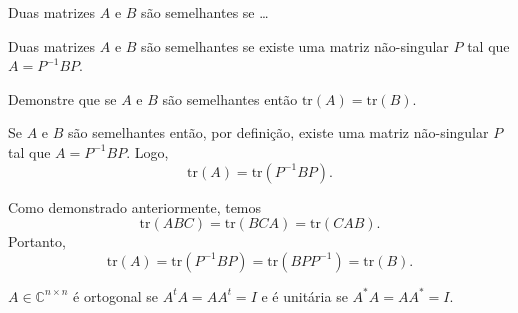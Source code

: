 \documentclass[a4paper,12pt, leqno, answers]{exam}
\begin{document}
\begin{questions}
    \question Duas matrizes $A$ e $B$ s\~{a}o semelhantes se \dots
    \begin{solution}
        Duas matrizes $A$ e $B$ s\~{a}o semelhantes se existe uma matriz n\~{a}o-singular $P$ tal que $A = P^{-1} B P$.
    \end{solution}

    Demonstre que se $A$ e $B$ s\~{a}o semelhantes ent\~{a}o $\mbox{tr}(A) = \mbox{tr}(B)$.
    \begin{solution}
        Se $A$ e $B$ s\~{a}o semelhantes ent\~{a}o, por defini\c{c}\~{a}o, existe uma matriz n\~{a}o-singular $P$ tal que $A = P^{-1} B P$. Logo,
        \[
        \mbox{tr}(A) = \mbox{tr}(P^{-1} B P).
        \]

        Como demonstrado anteriormente, temos
        \[
        \mbox{tr}(A B C) = \mbox{tr}(B C A) = \mbox{tr}(C A B).
        \]
        Portanto,
        \[
        \mbox{tr}(A) = \mbox{tr}(P^{-1} B P) = \mbox{tr}(B P P^{-1}) = \mbox{tr}(B).
        \]
    \end{solution}

    \question $A \in \mathbb{C}^{n \times n}$ \'{e} ortogonal se $A^t A = A A^t = I$ e \'{e} unit\'{a}ria se $A^* A = A A^* = I$.
\end{questions}
\end{document}
